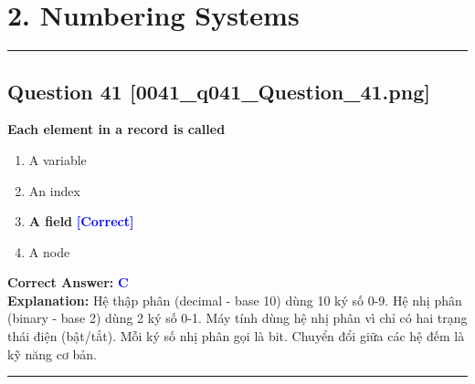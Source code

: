 \documentclass[11pt,a4paper]{article}
\begin{document}
\newpage
\section*{2. Numbering Systems}
\hrule\vspace{0.5cm}

\begin{minipage}{\textwidth}
\subsection*{Question 41 \quad \footnotesize{[0041\_q041\_Question\_41.png]}}
\noindent \textbf{Each element in a record is called}

\begin{enumerate}[label=\Alph*.]
    \item A variable
    \item An index
    \item \textbf{A field} \hfill \textcolor{blue}{\textbf{[Correct]}}
    \item A node
\end{enumerate}

\noindent \textbf{Correct Answer:} \textcolor{blue}{\textbf{C}} \\[2pt]
\noindent \textbf{Explanation:} Hệ thập phân (decimal - base 10) dùng 10 ký số 0-9. Hệ nhị phân (binary - base 2) dùng 2 ký số 0-1. Máy tính dùng hệ nhị phân vì chỉ có hai trạng thái điện (bật/tắt). Mỗi ký số nhị phân gọi là bit. Chuyển đổi giữa các hệ đếm là kỹ năng cơ bản.

\par\vspace{0.3cm}
\hrule
\vspace{0.3cm}
\end{minipage}
\end{document}
